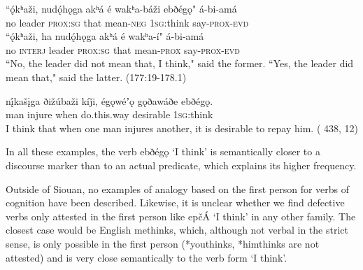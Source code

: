 \documentclass[oldfontcommands,oneside,a4paper,11pt]{article}
\newcommand{\ipa}[1]{{\phon#1}} %
\begin{document}
 
\begin{exe}
 \ex \label{ex:ebdhegon} 
 \gll ``\ipa{ǫ́kʰaži,}  	\ipa{nudǫ́hǫga}  	\ipa{akʰá}  	\ipa{é}  	\ipa{wakʰa-báži}  	\ipa{ebðégǫ}"  	\ipa{á-bi-amá}\\
no leader \textsc{prox:sg} that mean-\textsc{neg} \textsc{1sg}:think say-\textsc{prox-evd}\\
 \ex \label{ex:no.ebdhegon}
 \gll ``\ipa{ǫ́kʰaži,}  \ipa{ha}	 \ipa{nudǫ́hǫga}  	\ipa{akʰá}  	\ipa{é}  	\ipa{wakʰa-í}"   	\ipa{á-bi-amá}  \\
no \textsc{interj} leader \textsc{prox:sg} that mean-\textsc{prox}  say-\textsc{prox-evd} \\
\glt ``No, the leader did not mean that, I think," said the former. ``Yes, the leader did mean that," said the latter. (177:19-178.1)
\end{exe}


\begin{exe}
 \ex \label{ex:ebdhegon2}
 \gll 
\ipa{nį́kašįga}  	\ipa{ðižúbaži}  	\ipa{kíǰi,}  	\ipa{égǫwéʼǫ}  	\ipa{gǫðawáðe}  	\ipa{ebðégǫ.}  \\
man injure when do.this.way desirable \textsc{1sg}:think \\
\glt I think that when one man injures another, it is desirable to repay him. ( 438,  12)
  \end{exe}

In all these examples, the verb  \ipa{ebðégǫ}  `I think' is semantically closer to a discourse marker than to an actual predicate, which explains its higher frequency. 



Outside of Siouan, no examples of analogy based on the first person for verbs of cognition have been described. Likewise, it is unclear whether we find defective verbs only attested in the first person like \ipa{epčÁ} `I think'  in any other family. The closest case would be English \ipa{methinks}, which, although not verbal in the strict sense, is only possible in the first person (*\ipa{youthinks}, *\ipa{himthinks} are not attested) and is very close semantically to the verb form `I think'.
\end{document}
